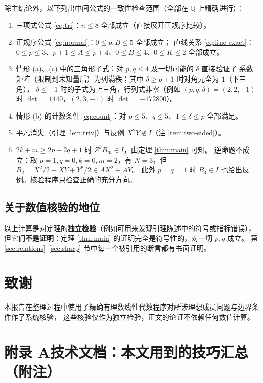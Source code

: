 \documentclass[11pt,UTF8]{ctexart}
\theoremstyle{definition}
\newcommand{\Q}{\mathbb{Q}}
\begin{document}
除主结论外，以下列出中间公式的一致性检查范围（全部在 $\Q$ 上精确进行）：

\begin{enumerate}[label=(\arabic*)]
\item 三项式公式 \eqref{eq:tri}：$n\le8$ 全部成立（直接展开正规序比较）。
\item 正规序公式 \eqref{eq:normal}：$0\le p,B\le5$ 全部成立；
直线关系 \eqref{eq:line-exact}：$0\le p\le3$、$p+1\le A\le p+4$、$0\le B\le4$、$0\le K\le2$ 全部成立。
\item 情形 (a)、(c) 中的三角形子式：对 $p,q\le4$ 及一切可能的 $\delta$ 直接验证了
系数矩阵（限制到未知量后）为列满秩；其中 $\delta\ge p+1$ 时对角元全为 $1$（下三角），
$\delta\le-1$ 时的子式为上三角，行列式非零（例如 $(p,q,\delta)=(2,2,-1)$ 时
$\det=1440$，$(2,3,-1)$ 时 $\det=-172800$）。
\item 情形 (b) 的计数条件 \eqref{eq:count}：对 $p\le5$、$q\le5$、$1\le\delta\le p$ 全部满足。
\item 平凡消失（引理 \ref{lem:triv}）与反例 $X^2Y\notin I$（注 \ref{rem:two-sided}）。
\item $2k+m\ge 2p+2q+1$ 时 $Z^{k}B_m\in I$，由定理 \ref{thm:main} 可知。
逆命题不成立：取 $p=1,q=0,k=0,m=2$，有 $N=3$，但 $B_2=X^2/2+XY+Y^2/2\in AX^2+AY$。
此外 $p=q=1$ 时 $B_4\in I$ 也给出反例。核验程序只检查正确的充分方向。
\end{enumerate}

\subsection{关于数值核验的地位}

以上计算是对定理的\textbf{独立检验}（例如可用来发现引理陈述中的符号或指标错误），
但它们\textbf{不是证明}：定理 \ref{thm:main} 的证明完全是符号性的，对一切 $p,q$ 成立。
第 \ref{sec:relations}--\ref{sec:sharp} 节中每一个被引用的断言都有书面证明。

\section*{致谢}
本报告在整理过程中使用了精确有理数线性代数程序对所涉理想成员问题与边界条件作了系统核验，
这些核验仅作为独立检验，正文的论证不依赖任何数值计算。

\appendix
{}
\section*{附录 A\quad 技术文档：本文用到的技巧汇总（附注）}
\end{document}
